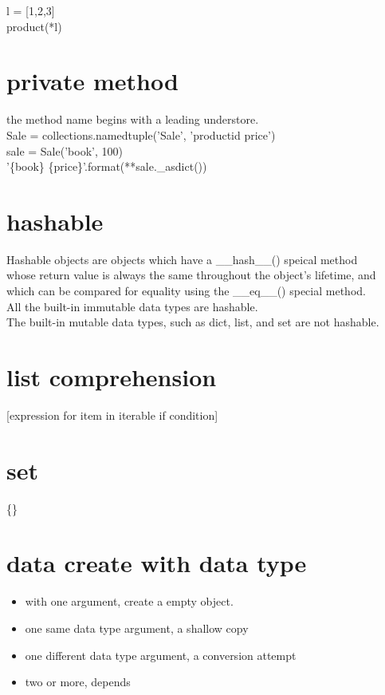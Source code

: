 \documentclass[11pt]{article}
\begin{document}
l = [1,2,3] \\
product(*l) \\



\section{private method}
\label{sec-7}
the method name begins with a leading understore. \\

Sale = collections.namedtuple('Sale', 'productid price') \\
sale = Sale('book', 100) \\
'\{book\} \{price\}'.format(**sale.\_asdict()) \\

\section{hashable}
\label{sec-8}
Hashable objects are objects which have a \_\_hash\_\_() speical method \\
whose return value is always the same throughout the object's lifetime, and \\
which can be compared for equality using the \_\_eq\_\_() special method. \\


All the built-in immutable data types are hashable. \\
The built-in mutable data types, such as dict, list, and set are not hashable. \\

\section{list comprehension}
\label{sec-9}
[expression for item in iterable if condition] \\



\section{set}
\label{sec-10}
\{\} \\

\section{data create with data type}
\label{sec-11}
\begin{itemize}
\item with one argument, create a empty object. \\
\item one same data type argument, a shallow copy \\
\item one different data type argument, a conversion attempt \\
\item two or more, depends \\
\end{itemize}
\end{document}

